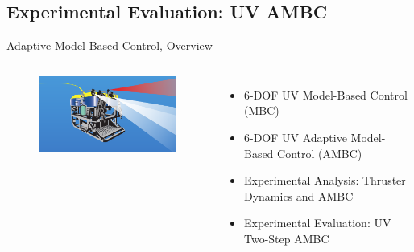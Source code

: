 \subsection{Experimental Evaluation: UV AMBC}


\begin{frame}[t]{Adaptive Model-Based Control, Overview}%
   \begin{columns}
    \begin{center}
      \begin{figure}[htbp]
        \begin{center}
          \includegraphics[width=\textwidth]{./pres/images/justJason}
        \end{center}
      \end{figure}
    \end{center}

   \begin{itemize}
\item<1> 6-DOF UV Model-Based Control (MBC)
\item<1> 6-DOF UV Adaptive Model-Based Control (AMBC)
\item<1-2,4> Experimental Analysis: Thruster Dynamics and AMBC
\item<1,3-4> Experimental Evaluation: UV Two-Step AMBC
   \end{itemize}
\end{columns}

\vskip9pt

\end{frame}



